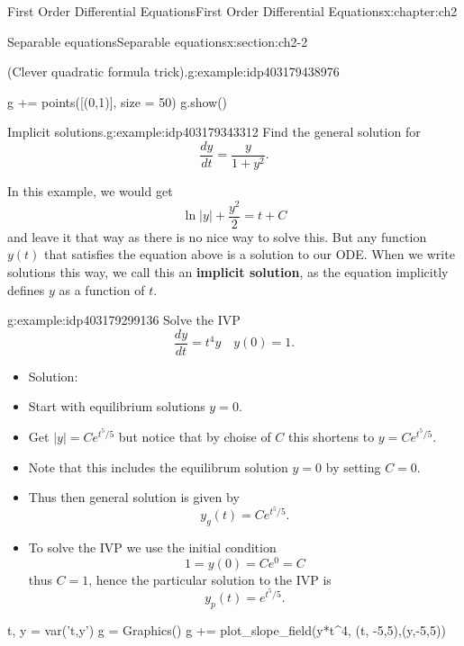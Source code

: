 \documentclass[oneside,10pt,]{book}
\newcommand{\terminology}[1]{\textbf{#1}}
\numberwithin{equation}{section}
\numberwithin{equation}{section}
\begin{document}
\begin{chapterptx}{First Order Differential Equations}{}{First Order Differential Equations}{}{}{x:chapter:ch2}
\begin{sectionptx}{Separable equations}{}{Separable equations}{}{}{x:section:ch2-2}
\begin{example}{(Clever quadratic formula trick).}{g:example:idp403179438976}
\begin{sageinput}
g += points([(0,1)], size = 50)
g.show()
\end{sageinput}
\end{example}
\begin{example}{Implicit solutions.}{g:example:idp403179343312}%
Find the general solution for%
\begin{equation*}
\frac{dy}{dt}=\frac{y}{1+y^{2}}.
\end{equation*}
%
\par
In this example, we would get%
\begin{equation*}
\ln\left|y\right|+\frac{y^{2}}{2}=t+C
\end{equation*}
and leave it that way as there is no nice way to solve this. But any function \(y(t)\) that satisfies the equation above is a solution to our ODE. When we write solutions this way, we call this an \terminology{implicit solution}, as the equation implicitly defines \(y\) as a function of \(t\).%
\end{example}
\begin{example}{}{g:example:idp403179299136}%
Solve the IVP%
\begin{equation*}
\frac{dy}{dt}=t^{4}y\,\,\,\,\,\,y(0)=1.
\end{equation*}
%
%
\begin{itemize}[label=\textbullet]
\item{}Solution:%
\item{}Start with equilibrium solutions \(y=0\).%
\item{}Get \(\left|y\right|=Ce^{t^{5}/5}\) but notice that by choise of \(C\) this shortens to \(y=Ce^{t^{5}/5}\).%
\item{}Note that this includes the equilibrum solution \(y=0\) by setting \(C=0\).%
\item{}Thus then general solution is given by%
\begin{equation*}
y_g(t)=Ce^{t^{5}/5}.
\end{equation*}
%
\item{}To solve the IVP we use the initial condition%
\begin{equation*}
1=y(0)=Ce^{0}=C
\end{equation*}
thus \(C=1\), hence the particular solution to the IVP is%
\begin{equation*}
y_p(t)=e^{t^{5}/5}.
\end{equation*}
%
\end{itemize}
\begin{sageinput}
t, y = var('t,y')
g = Graphics()
g += plot_slope_field(y*t^4, (t, -5,5),(y,-5,5))

\end{sageinput}
\end{example}
\end{sectionptx}
\end{chapterptx}
\end{document}
